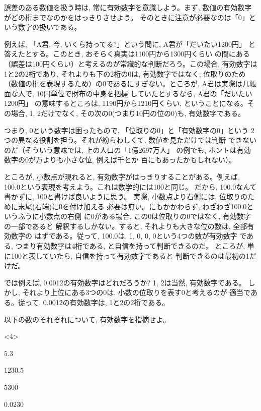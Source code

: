 誤差のある数値を扱う時は, 常に有効数字を意識しよう。まず, 
数値の有効数字がどの桁までなのかをはっきりさせよう。
そのときに注意が必要なのは「0」という数字の扱いである。

例えば, 「A君, 今, いくら持ってる?」という問に, A君が「だいたい1200円」
と答えたとする。このとき, おそらく真実は1100円から1300円くらい
の間にある（誤差は100円くらい）と考えるのが常識的な判断だろう。この場合, 
有効数字は1と2の2桁であり, それよりも下の2桁の0は, 有効数字ではなく, 
位取りのため（数値の桁を表現するため）の0であるにすぎない。ところが, 
A君は実際は几帳面な人で, 10円単位で財布の中身を把握
していたとするなら, A君の「だいたい1200円」
の意味するところは, 1190円から1210円くらい, ということになる。その場合, 
1, 2だけでなく, その次の0(つまり10円の位の0)も, 有効数字である。

つまり, 0という数字は困ったもので, 「位取りの0」と「有効数字の0」という
2つの異なる役割を担う。それが紛らわしくて, 数値を見ただけでは判断
できないのだ（そういう意味では, 上の人口の「1億2697万人」
の例でも, ホントは有効数字の0が万よりも小さな位, 例えば千とか
百にもあったかもしれない）。

ところが, 小数点が現れると, 有効数字がはっきりすることがある。例えば, 
100.0という表現を考えよう。これは数学的には100と同じ。
だから, 100.0なんて書かずに, 100と書けば良いように思う。
実際, 小数点より右側には, 位取りのために末尾(右端)に0を付け加える
必要は無い。にもかかわらず, わざわざ100.0というふうに小数点の右側
に0がある場合, この0は位取りの0ではなく, 有効数字の一部であると
解釈するしかない。すると, それよりも大きな位の数は, 全部有効数字の
はずである。従って, 100.0は, 1, 0, 0, 0という4つの数が有効数字
である, つまり有効数字は4桁である, と自信を持って判断できるのだ。
ところが, 単に100と表していたら, 自信を持って有効数字であると
判断できるのは最初の1だけだ。

では例えば, 0.0012の有効数字はどれだろうか? 1, 2は当然, 有効数字である。
しかし, それより上位にある3つの0は, 小数の位取りを表す0と考えるのが
適当である。従って, 0.0012の有効数字は, 1と2の2桁である。\\

\begin{q}\label{q:guard_digit_order} 以下の数のそれぞれについて, 
有効数字を指摘せよ。
\begin{edaenumerate}<4>
\item $5.3$
\item $1230.5$
\item $5300$
\item $0.0230$
\end{edaenumerate}
\end{q}

